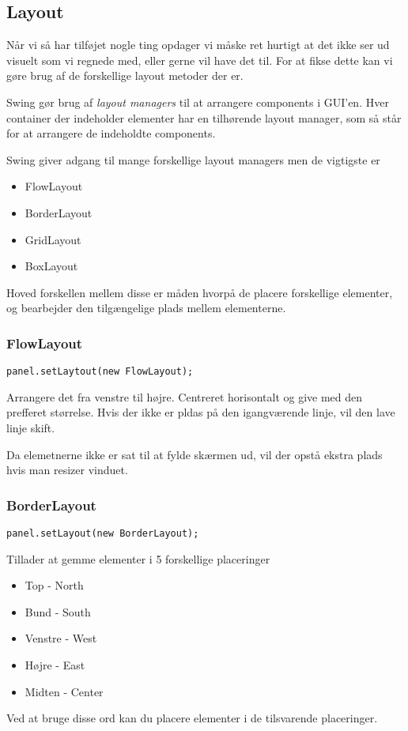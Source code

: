 \documentclass{article}
\begin{document}
\subsection*{Layout}
Når vi så har tilføjet nogle ting opdager vi måske ret hurtigt at det ikke ser ud visuelt som vi regnede med, eller gerne vil have det til. For at fikse dette kan vi gøre brug af de forskellige layout metoder der er.

Swing gør brug af \textit{layout managers} til at arrangere components i GUI'en. Hver container der indeholder elementer har en tilhørende layout manager, som så står for at arrangere de indeholdte components.

Swing giver adgang til mange forskellige layout managers men de vigtigste er 
\begin{itemize}
    \item FlowLayout
    \item BorderLayout
    \item GridLayout
    \item BoxLayout
\end{itemize}

Hoved forskellen mellem disse er måden hvorpå de placere forskellige elementer, og bearbejder den tilgængelige plads mellem elementerne.

\subsubsection*{FlowLayout}
\begin{verbatim}
panel.setLaytout(new FlowLayout);
\end{verbatim}
Arrangere det fra venstre til højre. Centreret horisontalt og give med den prefferet størrelse.
Hvis der ikke er pldas på den igangværende linje, vil den lave linje skift.

Da elemetnerne ikke er sat til at fylde skærmen ud, vil der opstå ekstra plads hvis man resizer vinduet.

\subsubsection*{BorderLayout}
\begin{verbatim}
panel.setLayout(new BorderLayout);
\end{verbatim}
Tillader at gemme elementer i 5 forskellige placeringer
\begin{itemize}
    \item Top - North
    \item Bund - South
    \item Venstre - West
    \item Højre - East
    \item Midten - Center
\end{itemize}    
Ved at bruge disse ord kan du placere elementer i de tilsvarende placeringer.
\end{document}
